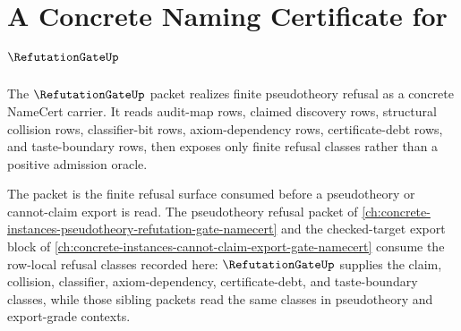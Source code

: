 \chapter{A Concrete Naming Certificate for $\RefutationGateUp$}
\label{ch:concrete-instances-refutation-gate-namecert}

The $\RefutationGateUp$ packet realizes finite pseudotheory refusal as a concrete NameCert carrier. It reads audit-map rows, claimed discovery rows, structural collision rows, classifier-bit rows, axiom-dependency rows, certificate-debt rows, and taste-boundary rows, then exposes only finite refusal classes rather than a positive admission oracle.

The packet is the finite refusal surface consumed before a pseudotheory or cannot-claim export is read. The pseudotheory refusal packet of \autoref{ch:concrete-instances-pseudotheory-refutation-gate-namecert} and the checked-target export block of \autoref{ch:concrete-instances-cannot-claim-export-gate-namecert} consume the row-local refusal classes recorded here: $\RefutationGateUp$ supplies the claim, collision, classifier, axiom-dependency, certificate-debt, and taste-boundary classes, while those sibling packets read the same classes in pseudotheory and export-grade contexts.



